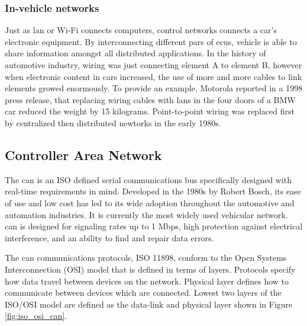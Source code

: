 \subsubsection{In-vehicle networks} %
\label{ssub:in_vehicle_networks}
Just as \gls{lan} or Wi-Fi connects computers, control networks connects a car's electronic equipment. By interconnecting different pars of \glspl{ecu}, vehicle is able to share information amongst all distributed applications. In the history of automotive industry, wiring was just connecting element A to element B, however when electronic content in cars increased, the use of more and more cables to link elements growed enormously. To provide an example, Motorola reported in a 1998 press release, that replacing wiring cables with \gls{lan}s in the four doors of a BMW car reduced the weight by 15 kilograms.\cite{976923} Point-to-point wiring was replaced first by centralized then distributed newtorks in the early 1980s.\cite{815878}
\subsection{Controller Area Network} %
\label{sub:controller_area_network}
The \gls{can} is an ISO defined serial communications bus specifically designed with real-time requirements in mind. Developed in the 1980s by Robert Bosch, its ease of use and low cost has led to its wide adoption throughout the automotive and automation industries\cite{788104}. It is currently the most widely used vehicular network\cite{976923}. \gls{can} is designed for signaling rates up to 1 Mbps, high protection against electrical interference, and an ability to find and repair data errors.

The \gls{can} communications protocols, ISO 11898, conform to the Open Systems Interconnection (OSI) model that is defined in terms of layers\cite{5116731}. Protocols specify how data travel between devices on the network. Physical layer defines how to communicate between devices which are connected. Lowest two layers of the ISO/OSI model are defined as the data-link and physical layer shown in Figure \ref{fig:iso_osi_can}.

